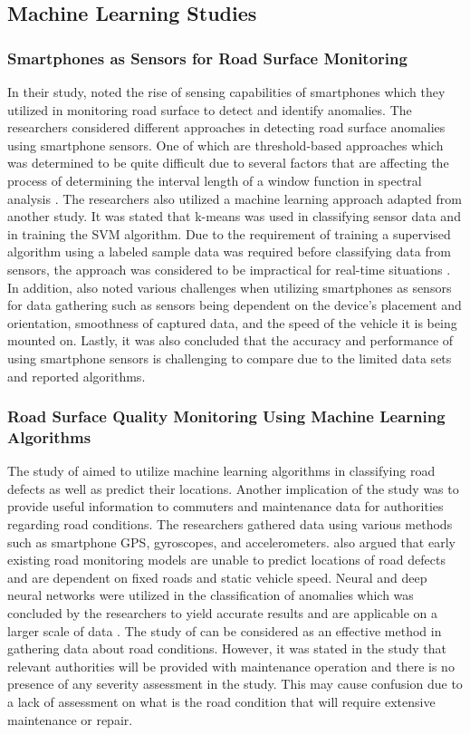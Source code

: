 \subsection{Machine Learning Studies}

\subsubsection{Smartphones as Sensors for Road Surface Monitoring}
In their study,  noted the rise of sensing capabilities of smartphones which they utilized in monitoring road surface to detect and identify anomalies. The researchers considered different approaches in detecting road surface anomalies using smartphone sensors. One of which are threshold-based approaches which was determined to be quite difficult  due to several factors that are affecting the process of determining the interval length of a window function in spectral analysis \cite{sattar2018}. The researchers also utilized a machine learning approach adapted from another study. It was stated that k-means was used in classifying sensor data and in training the SVM algorithm. Due to the requirement of training a supervised algorithm using a labeled sample data was required before classifying data from sensors, the approach was considered to be impractical for real-time situations \cite{sattar2018}. In addition,  also noted various challenges when utilizing smartphones as sensors for data gathering such as sensors being dependent on the device’s placement and orientation, smoothness of captured data, and the speed of the vehicle it is being mounted on. Lastly, it was also concluded that the accuracy and performance of using smartphone sensors is challenging to compare due to the limited data sets and reported algorithms.

\subsubsection{Road Surface Quality Monitoring Using Machine Learning Algorithms}
The study of  aimed to utilize machine learning algorithms in classifying road defects as well as predict their locations. Another implication of the study was to provide useful information to commuters and maintenance data for authorities regarding road conditions. The researchers gathered data using various methods such as smartphone GPS, gyroscopes, and accelerometers. \cite{singh2021} also argued that early existing road monitoring models are unable to predict locations of road defects and are dependent on fixed roads and static vehicle speed.  Neural and deep neural networks were utilized in the classification of anomalies which was concluded by the researchers to yield accurate results and are applicable on a larger scale of data \cite{singh2021}. The study of  can be considered as an effective method in gathering data about road conditions. However, it was stated in the study that relevant authorities will be provided with maintenance operation and there is no presence of any severity assessment in the study. This may cause confusion due to a lack of assessment on what is the road condition that will require extensive maintenance or repair.

